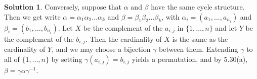 \documentclass{article}
\theoremstyle{definition}
\newtheorem*{solution}{Solution}
\begin{document}
\begin{enumerate}
\begin{solution}
Conversely, suppose that $\alpha$ and $\beta$ have the same cycle structure.  Then we get write $\alpha = \alpha_1\alpha_2\dots\alpha_k$ and $\beta = \beta_1\beta_2\dots\beta_k$, with $\alpha_i = (a_1, \dots, a_{n_i})$ and $\beta_i = (b_1, \dots, b_{n_i})$.  Let $X$ be the complement of the $a_{i,j}$ in $\{1, \dots, n\}$ and let $Y$ be the complement of the $b_{i,j}$.  Then the cardinality of $X$ is the same as the cardinality of $Y$, and we may choose a bijection $\gamma$ between them.  Extending $\gamma$ to all of $\{1, \dots, n\}$ by setting $\gamma(a_{i,j}) = b_{i,j}$ yields a permutation, and by 5.30(a), $\beta = \gamma\alpha\gamma^{-1}$.
\end{solution}
\end{enumerate}
\end{document}
